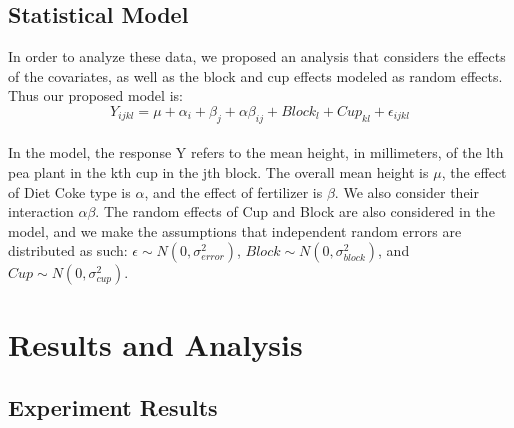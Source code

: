 \documentclass[1p,12pt]{elsarticle}\usepackage[]{graphicx}\usepackage[]{color}
\begin{document}
\subsection{Statistical Model}
In order to analyze these data, we proposed an analysis that considers the effects of the covariates, as well as the block and cup effects modeled as random effects. Thus our proposed model is: 
\\
\begin{equation}
Y_{ijkl} = \mu + \alpha_i + \beta_j  + \alpha\beta_{ij} + Block_l + Cup_{kl} + \epsilon_{ijkl}
\end{equation}
\\
In the model, the response Y refers to the mean height, in millimeters, of the lth pea plant in the kth cup in the jth block. The overall mean height is $\mu$, the effect of Diet Coke type is $\alpha$, and the effect of fertilizer is $\beta$. We also consider their interaction $\alpha\beta$. The random effects of Cup and Block are also considered in the model, and we make the assumptions that independent random errors are distributed as such: $\epsilon \sim N(0,\sigma^2_{error})$, $Block \sim N(0,\sigma^2_{block})$, and $Cup \sim N(0,\sigma^2_{cup})$. 





\section{Results and Analysis}
\subsection{Experiment Results}
\end{document}
